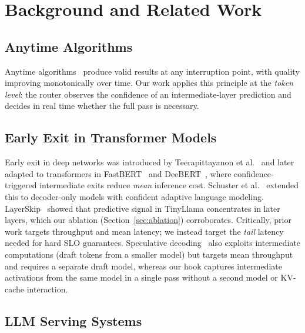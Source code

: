 \documentclass[conference]{IEEEtran}
\begin{document}
\section{Background and Related Work}

\subsection{Anytime Algorithms}

Anytime algorithms~\cite{zilberstein1996using,boddy1994deliberation}
produce valid results at any interruption point, with quality improving
monotonically over time.
Our work applies this principle at the \emph{token level}: the router
observes the confidence of an intermediate-layer prediction and decides
in real time whether the full pass is necessary.

\subsection{Early Exit in Transformer Models}

Early exit in deep networks was introduced by
Teerapittayanon et al.~\cite{teerapittayanon2016branchynet} and later
adapted to transformers in FastBERT~\cite{liu2020fastbert} and
DeeBERT~\cite{xin2020deebert}, where confidence-triggered intermediate
exits reduce \emph{mean} inference cost.
Schuster et al.~\cite{schuster2022confident} extended this to
decoder-only models with confident adaptive language modeling.
LayerSkip~\cite{elhoushi2024layerskip} showed that predictive signal
in TinyLlama concentrates in later layers, which our ablation
(Section~\ref{sec:ablation}) corroborates.
Critically, prior work targets throughput and mean latency;
we instead target the \emph{tail} latency needed for hard SLO guarantees.
Speculative decoding~\cite{leviathan2023fast,chen2023accelerating} also
exploits intermediate computations (draft tokens from a smaller model)
but targets mean throughput and requires a separate draft model, whereas
our hook captures intermediate activations from the same model in a
single pass without a second model or KV-cache interaction.

\subsection{LLM Serving Systems}
\end{document}
